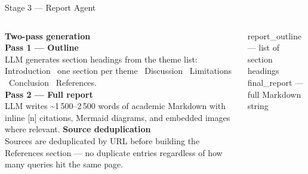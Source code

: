 \documentclass[aspectratio=169, 10pt]{beamer}
\newcommand{\code}[1]{{\ttfamily\small\color{code-red}#1}}
\begin{document}
\begin{frame}{Stage 3 --- Report Agent}
  \begin{columns}[T]
      \textbf{\color{aims-orange}Two-pass generation}\\[0.4em]
      \textbf{Pass 1 --- Outline}\\[0.2em]
      {\small LLM generates section headings from the theme list:
      Introduction \textbullet\ one section per theme \textbullet\ Discussion
      \textbullet\ Limitations \textbullet\ Conclusion \textbullet\ References.}\\[0.5em]
      \textbf{Pass 2 --- Full report}\\[0.2em]
      {\small LLM writes \textasciitilde1\,500--2\,500 words of academic Markdown
      with inline \code{[n]} citations, Mermaid diagrams, and embedded
      images where relevant.}
      \textbf{\color{aims-orange}Source deduplication}\\[0.3em]
      {\small Sources are deduplicated by URL before building the
      References section --- no duplicate entries regardless of how many
      queries hit the same page.}
      \vspace{0.4em}
      \begin{block}{}
        \scriptsize
        \code{report\_outline} --- list of section headings\\[0.4em]
        \code{final\_report} --- full Markdown string
      \end{block}
  \end{columns}
\end{frame}
\end{document}
